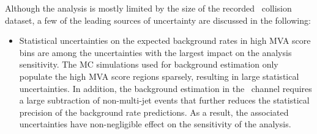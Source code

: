 Although the analysis is mostly limited by the size of the recorded
\pp~collision dataset, a few of the leading sources of uncertainty are discussed
in the following:
\begin{itemize}

\item Statistical uncertainties on the expected background rates in high MVA
  score bins are among the uncertainties with the largest impact on the analysis
  sensitivity. The MC simulations used for background estimation only populate
  the high MVA score regions sparsely, resulting in large statistical
  uncertainties. In addition, the \faketauhadvis background estimation in the
  \hadhad~channel requires a large subtraction of non-multi-jet events that
  further reduces the statistical precision of the background rate
  predictions. As a result, the associated uncertainties have non-negligible
  effect on the sensitivity of the analysis.





\end{itemize}
